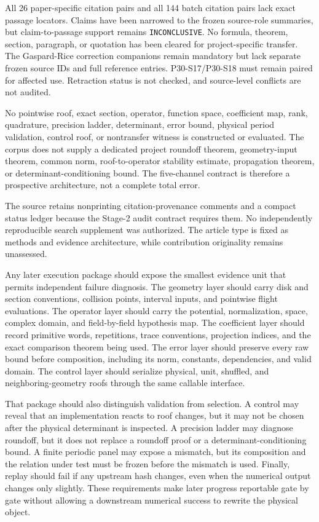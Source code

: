 \documentclass[11pt,a4paper]{article}
\begin{document}
All 26 paper-specific citation pairs and all 144 batch citation pairs lack exact passage locators. Claims have been narrowed to the frozen source-role summaries, but claim-to-passage support remains \texttt{INCONCLUSIVE}. No formula, theorem, section, paragraph, or quotation has been cleared for project-specific transfer. The Gaspard-Rice correction companions remain mandatory but lack separate frozen source IDs and full reference entries. P30-S17/P30-S18 must remain paired for affected use. Retraction status is not checked, and source-level conflicts are not audited.

No pointwise roof, exact section, operator, function space, coefficient map, rank, quadrature, precision ladder, determinant, error bound, physical period validation, control roof, or nontransfer witness is constructed or evaluated. The corpus does not supply a dedicated project roundoff theorem, geometry-input theorem, common norm, roof-to-operator stability estimate, propagation theorem, or determinant-conditioning bound. The five-channel contract is therefore a prospective architecture, not a complete total error.

The source retains nonprinting citation-provenance comments and a compact status ledger because the Stage-2 audit contract requires them. No independently reproducible search supplement was authorized. The article type is fixed as methods and evidence architecture, while contribution originality remains unassessed.

Any later execution package should expose the smallest evidence unit that permits independent failure diagnosis. The geometry layer should carry disk and section conventions, collision points, interval inputs, and pointwise flight evaluations. The operator layer should carry the potential, normalization, space, complex domain, and field-by-field hypothesis map. The coefficient layer should record primitive words, repetitions, trace conventions, projection indices, and the exact comparison theorem being used. The error layer should preserve every raw bound before composition, including its norm, constants, dependencies, and valid domain. The control layer should serialize physical, unit, shuffled, and neighboring-geometry roofs through the same callable interface.

That package should also distinguish validation from selection. A control may reveal that an implementation reacts to roof changes, but it may not be chosen after the physical determinant is inspected. A precision ladder may diagnose roundoff, but it does not replace a roundoff proof or a determinant-conditioning bound. A finite periodic panel may expose a mismatch, but its composition and the relation under test must be frozen before the mismatch is used. Finally, replay should fail if any upstream hash changes, even when the numerical output changes only slightly. These requirements make later progress reportable gate by gate without allowing a downstream numerical success to rewrite the physical object.
\end{document}
